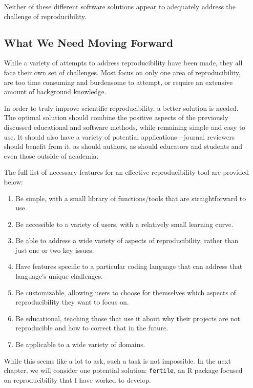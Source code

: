 \documentclass[12pt,twoside]{reedthesis}
\providecommand{\tightlist}{%
  \setlength{\itemsep}{0pt}\setlength{\parskip}{0pt}}
\begin{document}
Neither of these different software solutions appear to adequately
address the challenge of reproducibility.

\subsection{What We Need Moving
Forward}\label{what-we-need-moving-forward}

While a variety of attempts to address reproducibility have been made,
they all face their own set of challenges. Most focus on only one area
of reproducibility, are too time consuming and burdensome to attempt, or
require an extensive amount of background knowledge.

In order to truly improve scientific reproducibility, a better solution
is needed. The optimal solution should combine the positive aspects of
the previously discussed educational and software methods, while
remaining simple and easy to use. It should also have a variety of
potential applications---journal reviewers should benefit from it, as
should authors, as should educators and students and even those outside
of academia.

The full list of necessary features for an effective reproducibility
tool are provided below:
\begin{enumerate}
\def\labelenumi{\arabic{enumi})}
\tightlist
\item
  Be simple, with a small library of functions/tools that are
  straightforward to use.
\item
  Be accessible to a variety of users, with a relatively small learning
  curve.
\item
  Be able to address a wide variety of aspects of reproducibility,
  rather than just one or two key issues.
\item
  Have features specific to a particular coding language that can
  address that language's unique challenges.
\item
  Be customizable, allowing users to choose for themselves which aspects
  of reproducibility they want to focus on.
\item
  Be educational, teaching those that use it about why their projects
  are not reproducible and how to correct that in the future.
\item
  Be applicable to a wide variety of domains.
\end{enumerate}
While this seems like a lot to ask, such a task is not impossible. In
the next chapter, we will consider one potential solution:
\texttt{fertile}, an R package focused on reproducibility that I have
worked to develop.
\end{document}
